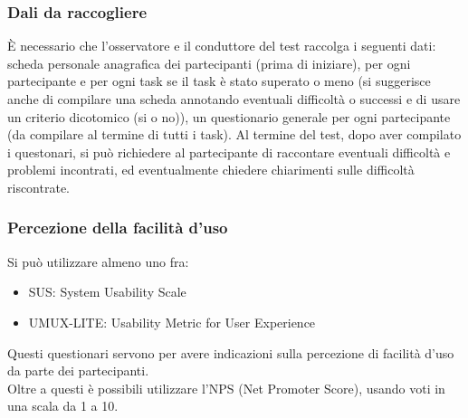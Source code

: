 \documentclass{article}
\begin{document}
\subsubsection{Dali da raccogliere}
È necessario che l'osservatore e il conduttore del test raccolga i seguenti dati: scheda personale anagrafica dei partecipanti (prima di iniziare), per ogni partecipante e per ogni task se il task è stato superato o meno (si suggerisce anche di compilare una scheda annotando eventuali difficoltà o successi e di usare un criterio dicotomico (si o no)), un questionario generale per ogni partecipante (da compilare al termine di tutti i task). Al termine del test, dopo aver compilato i questonari, si può richiedere al partecipante di raccontare eventuali difficoltà e problemi incontrati, ed eventualmente chiedere chiarimenti sulle difficoltà riscontrate.
\subsubsection{Percezione della facilità d'uso}
Si può utilizzare almeno uno fra:
\begin{itemize}
	\item SUS: System Usability Scale
	\item UMUX-LITE: Usability Metric for User Experience
\end{itemize}
Questi questionari servono per avere indicazioni sulla percezione di facilità d'uso da parte dei partecipanti.\\
Oltre a questi è possibili utilizzare l'NPS (Net Promoter Score), usando voti in una scala da 1 a 10.
\end{document}
